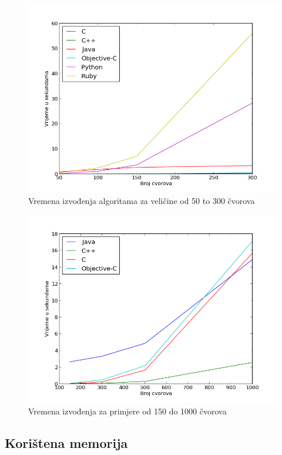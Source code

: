 \documentclass[times, utf8, seminar, numeric]{fer}
\begin{document}
\begin{figure}[!h]
\centering
\includegraphics[scale=0.6]{./img/Primjeri_50_300.png}
\caption{Vremena izvođenja algoritama za veličine od 50 to 300 čvorova}
\label{fig:time_50_300}
\end{figure}

\begin{figure}[!h]
\centering
\includegraphics[scale=0.6]{./img/Primjeri_150_1000.png}
\caption{Vremena izvođenja za primjere od 150 do 1000 čvorova}
\label{fig:time_150_1000}
\end{figure}

\newpage

\subsection{Korištena memorija}
\end{document}
